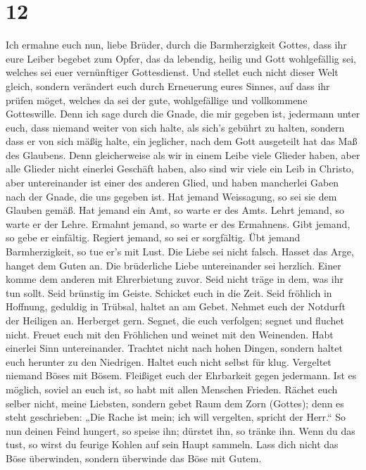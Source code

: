 \hypertarget{section-11}{%
\section{12}\label{section-11}}

 Ich ermahne euch nun, liebe Brüder, durch die
Barmherzigkeit Gottes, dass ihr eure Leiber begebet zum Opfer, das da
lebendig, heilig und Gott wohlgefällig sei, welches sei euer
vernünftiger Gottesdienst.  Und stellet euch nicht dieser
Welt gleich, sondern verändert euch durch Erneuerung eures Sinnes, auf
dass ihr prüfen möget, welches da sei der gute, wohlgefällige und
vollkommene Gotteswille.  Denn ich sage durch die Gnade,
die mir gegeben ist, jedermann unter euch, dass niemand weiter von sich
halte, als sich's gebührt zu halten, sondern dass er von sich mäßig
halte, ein jeglicher, nach dem Gott ausgeteilt hat das Maß des Glaubens.
 Denn gleicherweise als wir in einem Leibe viele Glieder
haben, aber alle Glieder nicht einerlei Geschäft haben, 
also sind wir viele ein Leib in Christo, aber untereinander ist einer
des anderen Glied,  und haben mancherlei Gaben nach der
Gnade, die uns gegeben ist.  Hat jemand Weissagung, so sei
sie dem Glauben gemäß. Hat jemand ein Amt, so warte er des Amts. Lehrt
jemand, so warte er der Lehre.  Ermahnt jemand, so warte
er des Ermahnens. Gibt jemand, so gebe er einfältig. Regiert jemand, so
sei er sorgfältig. Übt jemand Barmherzigkeit, so tue er's mit Lust.
 Die Liebe sei nicht falsch. Hasset das Arge, hanget dem
Guten an.  Die brüderliche Liebe untereinander sei
herzlich. Einer komme dem anderen mit Ehrerbietung zuvor.
 Seid nicht träge in dem, was ihr tun sollt. Seid
brünstig im Geiste. Schicket euch in die Zeit.  Seid
fröhlich in Hoffnung, geduldig in Trübsal, haltet an am Gebet.
 Nehmet euch der Notdurft der Heiligen an. Herberget
gern.  Segnet, die euch verfolgen; segnet und fluchet
nicht.  Freuet euch mit den Fröhlichen und weinet mit den
Weinenden.  Habt einerlei Sinn untereinander. Trachtet
nicht nach hohen Dingen, sondern haltet euch herunter zu den Niedrigen.
 Haltet euch nicht selbst für klug. Vergeltet niemand
Böses mit Bösem. Fleißiget euch der Ehrbarkeit gegen jedermann.
 Ist es möglich, soviel an euch ist, so habt mit allen
Menschen Frieden.  Rächet euch selber nicht, meine
Liebsten, sondern gebet Raum dem Zorn (Gottes); denn es steht
geschrieben: „Die Rache ist mein; ich will vergelten, spricht der
Herr.``  So nun deinen Feind hungert, so speise ihn;
dürstet ihn, so tränke ihn. Wenn du das tust, so wirst du feurige Kohlen
auf sein Haupt sammeln.  Lass dich nicht das Böse
überwinden, sondern überwinde das Böse mit Gutem.

